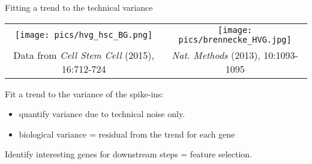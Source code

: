 \documentclass{beamer}
\begin{document}
\begin{frame}{Fitting a trend to the technical variance}
    \vspace{-0.2in}
\begin{center}
    \begin{tabular}{c@{}c}
    \texttt{[image: pics/hvg\_hsc\_BG.png]} &
    \texttt{[image: pics/brennecke\_HVG.jpg]} \\
    {\tiny Data from \emph{Cell Stem Cell} (2015), 16:712-724} &
    {\tiny \emph{Nat. Methods} (2013), 10:1093-1095}
\end{tabular}
\end{center}
Fit a trend to the variance of the spike-ins:
\begin{itemize}
    \item quantify variance due to technical noise only.
    \item biological variance = residual from the trend for each gene
\end{itemize}
Identify interesting genes for downstream steps = feature selection.
\end{frame}

%
%
\end{document}
